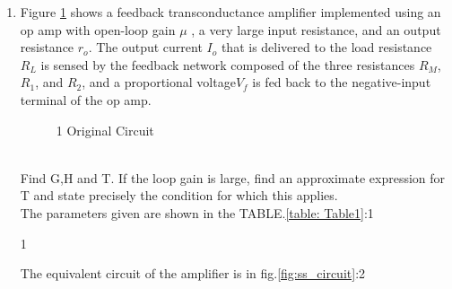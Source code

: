 \begin{enumerate}[label=\thesubsection.\arabic*.,ref=\thesubsection.\theenumi]

\item
Figure \ref{fig:original_circuit} shows a feedback transconductance
amplifier implemented using an op amp with open-loop gain $\mu$
, a very large input resistance, and an output resistance $r_{o}$.
The output current $I_{o}$ that is delivered to the load resistance $R_{L}$
is sensed by the feedback network composed of the three
resistances $R_{M}$, $R_{1}$, and $R_{2}$, and a proportional voltage$V_{f}$
is fed back to the negative-input terminal of the op amp.\\

\begin{figure}[!ht]
	\begin{center}
		\resizebox{\columnwidth}{!}{}
	\end{center}
\caption{1 Original Circuit}
\label{fig:original_circuit}
\end{figure}\\


Find G,H and T. If the loop gain is large, find an approximate expression for T
and state precisely the condition for which this applies.\\

\solution
The parameters given are shown in the TABLE.\ref{table: Table1}:1
\begin{table}[!ht]
\centering

\caption{1}
\label{table: Table1}
\end{table}
The equivalent circuit of the amplifier is in fig.\ref{fig:ss_circuit}:2


\end{enumerate}
